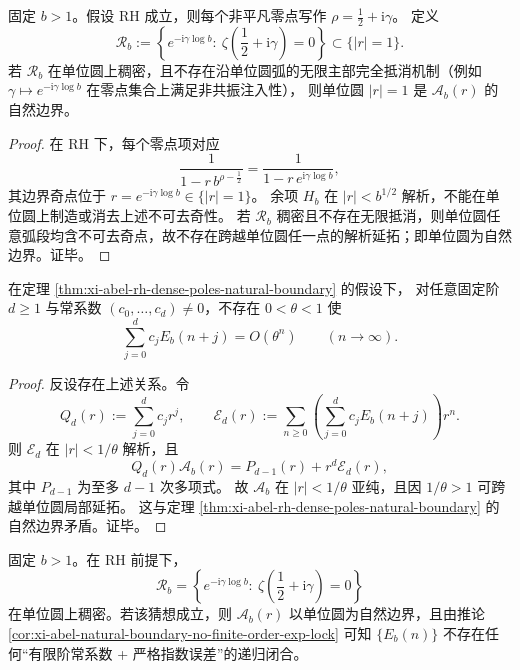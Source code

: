 \begin{theorem}[临界线极点稠密性导出单位圆自然边界]\label{thm:xi-abel-rh-dense-poles-natural-boundary}
固定 \(b>1\)。假设 RH 成立，则每个非平凡零点写作
\(
\rho=\frac12+\mathrm{i}\gamma
\)。
定义
\[
\mathcal R_b:=\left\{e^{-\mathrm{i}\gamma\log b}:\ \zeta\!\left(\frac12+\mathrm{i}\gamma\right)=0\right\}\subset\{|r|=1\}.
\]
若 \(\mathcal R_b\) 在单位圆上稠密，且不存在沿单位圆弧的无限主部完全抵消机制（例如
\(\gamma\mapsto e^{-\mathrm{i}\gamma\log b}\) 在零点集合上满足非共振注入性），
则单位圆 \(|r|=1\) 是 \(\mathcal A_b(r)\) 的自然边界。
\end{theorem}
\begin{proof}
在 RH 下，每个零点项对应
\[
\frac{1}{1-r\,b^{\rho-\frac12}}
=\frac{1}{1-r\,e^{\mathrm{i}\gamma\log b}},
\]
其边界奇点位于 \(r=e^{-\mathrm{i}\gamma\log b}\in\{|r|=1\}\)。
余项 \(H_b\) 在 \(|r|<b^{1/2}\) 解析，不能在单位圆上制造或消去上述不可去奇性。
若 \(\mathcal R_b\) 稠密且不存在无限抵消，则单位圆任意弧段均含不可去奇点，故不存在跨越单位圆任一点的解析延拓；即单位圆为自然边界。证毕。
\end{proof}

\begin{corollary}[自然边界下不存在有限阶指数误差锁定]\label{cor:xi-abel-natural-boundary-no-finite-order-exp-lock}
在定理 \ref{thm:xi-abel-rh-dense-poles-natural-boundary} 的假设下，
对任意固定阶 \(d\ge 1\) 与常系数 \((c_0,\dots,c_d)\neq 0\)，不存在 \(0<\theta<1\) 使
\[
\sum_{j=0}^{d}c_jE_b(n+j)=O(\theta^n)\qquad(n\to\infty).
\]
\end{corollary}
\begin{proof}
反设存在上述关系。令
\[
Q_d(r):=\sum_{j=0}^{d}c_jr^j,\qquad
\mathcal E_d(r):=\sum_{n\ge 0}\left(\sum_{j=0}^{d}c_jE_b(n+j)\right)r^n.
\]
则 \(\mathcal E_d\) 在 \(|r|<1/\theta\) 解析，且
\[
Q_d(r)\mathcal A_b(r)=P_{d-1}(r)+r^d\mathcal E_d(r),
\]
其中 \(P_{d-1}\) 为至多 \(d-1\) 次多项式。
故 \(\mathcal A_b\) 在 \(|r|<1/\theta\) 亚纯，且因 \(1/\theta>1\) 可跨越单位圆局部延拓。
这与定理 \ref{thm:xi-abel-rh-dense-poles-natural-boundary} 的自然边界矛盾。证毕。
\end{proof}

\begin{conjecture}\label{conj:xi-abel-universal-boundary-pole-density}
固定 \(b>1\)。在 RH 前提下，
\[
\mathcal R_b=\left\{e^{-\mathrm{i}\gamma\log b}:\ \zeta\!\left(\frac12+\mathrm{i}\gamma\right)=0\right\}
\]
在单位圆上稠密。若该猜想成立，则 \(\mathcal A_b(r)\) 以单位圆为自然边界，且由推论
\ref{cor:xi-abel-natural-boundary-no-finite-order-exp-lock} 可知
\(\{E_b(n)\}\) 不存在任何“有限阶常系数 + 严格指数误差”的递归闭合。
\end{conjecture}

\endinput
